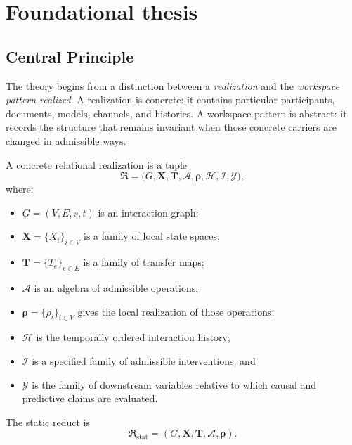 
\chapter{Foundational thesis}\label{SRWT:book:chapter-67}


\section{Central Principle}


The theory begins from a distinction between a \emph{realization} and the
\emph{workspace pattern realized}. A realization is concrete: it contains
particular participants, documents, models, channels, and histories. A
workspace pattern is abstract: it records the structure that remains invariant
when those concrete carriers are changed in admissible ways.

\begin{SRWTdefinition}\label{SRWT:def:realization}
A concrete relational realization is a tuple
\[
\mathfrak R
=
\bigl(
G,\mathbf X,\mathbf T,\mathcal A,\boldsymbol\rho,
\mathcal H,\mathcal I,\mathcal Y
\bigr),
\]
where:
\begin{itemize}
\item \(G=(V,E,s,t)\) is an interaction graph;
\item \(\mathbf X=\{X_i\}_{i\in V}\) is a family of local state spaces;
\item \(\mathbf T=\{T_e\}_{e\in E}\) is a family of transfer maps;
\item \(\mathcal A\) is an algebra of admissible operations;
\item \(\boldsymbol\rho=\{\rho_i\}_{i\in V}\) gives the local realization of those operations;
\item \(\mathcal H\) is the temporally ordered interaction history;
\item \(\mathcal I\) is a specified family of admissible interventions; and
\item \(\mathcal Y\) is the family of downstream variables relative to which causal and predictive claims are evaluated.
\end{itemize}
The static reduct is
\[
\mathfrak R_{\mathrm{stat}}
=
(G,\mathbf X,\mathbf T,\mathcal A,\boldsymbol\rho).
\]
\end{SRWTdefinition}

